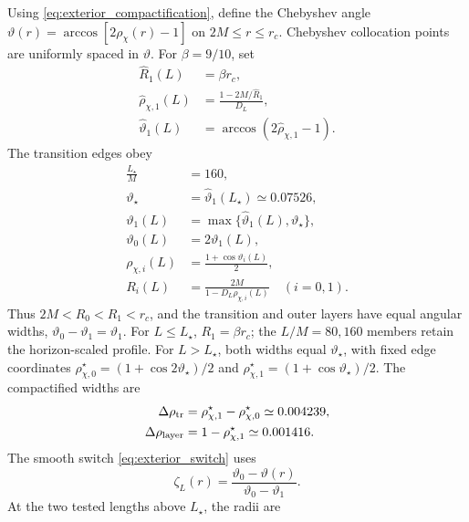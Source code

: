 \documentclass[
 aps,
 prd,
 reprint,
 superscriptaddress,
 nofootinbib,
 longbibliography
]{revtex4-2}
\begin{document}
Using \eqref{eq:exterior_compactification}, define the Chebyshev angle
$\vartheta(r)=\arccos[2\rho_\chi(r)-1]$ on $2M\leq r\leq r_c$.
Chebyshev collocation points are uniformly spaced in $\vartheta$.
For $\beta=9/10$, set
\begin{equation}
\begin{aligned}
 \widehat R_1(L)&=\beta r_c,\\
 \widehat\rho_{\chi,1}(L)&=
 \frac{1-2M/\widehat R_1}{D_L},\\
 \widehat\vartheta_1(L)&=
 \arccos\!\left(2\widehat\rho_{\chi,1}-1\right).
\end{aligned}
 \label{eq:horizon_scaled_transition}
\end{equation}
The transition edges obey
\begin{equation}
\begin{aligned}
 \frac{L_\star}{M}&=160,\\
 \vartheta_\star&=\widehat\vartheta_1(L_\star)
 \simeq0.07526,\\
 \vartheta_1(L)&=
 \max\{\widehat\vartheta_1(L),\vartheta_\star\},\\
 \vartheta_0(L)&=2\vartheta_1(L),\\
 \rho_{\chi,i}(L)&=\frac{1+\cos\vartheta_i(L)}{2},\\
 R_i(L)&=\frac{2M}{1-D_L\rho_{\chi,i}(L)}
 \quad(i=0,1).
\end{aligned}
 \label{eq:transition_radii}
\end{equation}
Thus $2M<R_0<R_1<r_c$, and the transition and outer layers have equal angular widths,
$\vartheta_0-\vartheta_1=\vartheta_1$.  For $L\leq L_\star$, $R_1=\beta r_c$;
the $L/M=80,160$ members retain the horizon-scaled profile.  For
$L>L_\star$, both widths equal $\vartheta_\star$, with fixed edge coordinates
$\rho_{\chi,0}^\star=(1+\cos2\vartheta_\star)/2$ and
$\rho_{\chi,1}^\star=(1+\cos\vartheta_\star)/2$.  The compactified widths are
\begin{align}
 \Delta\rho_{\rm tr}
 &=\rho_{\chi,1}^\star-\rho_{\chi,0}^\star
 \simeq0.004239,\notag\\
 \Delta\rho_{\rm layer}
 &=1-\rho_{\chi,1}^\star\simeq0.001416.
 \label{eq:transition_compact_widths}
\end{align}
The smooth switch \eqref{eq:exterior_switch} uses
\begin{equation}
 \zeta_L(r)=\frac{\vartheta_0-\vartheta(r)}
 {\vartheta_0-\vartheta_1}.
 \label{eq:production_exterior_switch}
\end{equation}
At the two tested lengths above $L_\star$, the radii are
\end{document}
